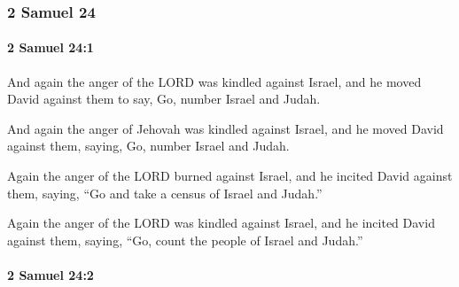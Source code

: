 	\subsubsection{2 Samuel 24} %
		\label{2SAMUEL-24}

		\paragraph{2 Samuel 24:1} %
			\label{2SAMUEL-24-1}

			And again the anger of the LORD was kindled against Israel, and he moved David against them to say, Go, number Israel and Judah.

			\begin{versebox}
					\item[BHS] 
					\item[ASV] And again the anger of Jehovah was kindled against Israel, and he moved David against them, saying, Go, number Israel and Judah.
					\item[NIV] Again the anger of the LORD burned against Israel, and he incited David against them, saying, “Go and take a census of Israel and Judah.”
					\item[NRSV] Again the anger of the LORD was kindled against Israel, and he incited David against them, saying, “Go, count the people of Israel and Judah.”
			\end{versebox}

		\paragraph{2 Samuel 24:2} %
			\label{2SAMUEL-24-2}


